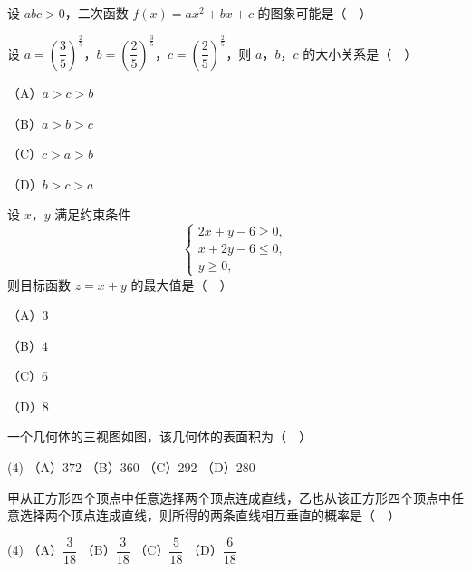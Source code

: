\begingroup
\renewenvironment{question}{\Needspace{0.5\textheight}}{}
\begin{question}
设 $abc>0$，二次函数 $f(x)=ax^2+bx+c$ 的图象可能是（　）
\nopagebreak[4]
\begin{center}\end{center}
\nopagebreak[4]
\end{question}
\endgroup
\begin{question}
设 $a=\left(\dfrac35\right)^{\frac25}$，$b=\left(\dfrac25\right)^{\frac35}$，$c=\left(\dfrac25\right)^{\frac25}$，则 $a$，$b$，$c$ 的大小关系是（　）

（A）$a>c>b$

（B）$a>b>c$

（C）$c>a>b$

（D）$b>c>a$

\end{question}
\begin{question}
设 $x$，$y$ 满足约束条件
\nopagebreak[4]
\[\begin{cases}2x+y-6\geqslant0,\\ x+2y-6\leqslant0,\\ y\geqslant0,\end{cases}\]
则目标函数 $z=x+y$ 的最大值是（　）

（A）$3$

（B）$4$

（C）$6$

（D）$8$

\Needspace{0.4\textheight}
\end{question}
\begingroup
\renewenvironment{question}{\Needspace{0.5\textheight}}{}
\begin{question}
一个几何体的三视图如图，该几何体的表面积为（　）
\nopagebreak[4]
\begin{center}\end{center}
\nopagebreak[4]
\begin{gkopts}(4)
\task （A）$372$
\task （B）$360$
\task （C）$292$
\task （D）$280$
\end{gkopts}

\end{question}
\endgroup
\begin{question}
甲从正方形四个顶点中任意选择两个顶点连成直线，乙也从该正方形四个顶点中任意选择两个顶点连成直线，则所得的两条直线相互垂直的概率是（　）

\begin{gkopts}(4)
\task （A）$\dfrac3{18}$
\task （B）$\dfrac3{18}$
\task （C）$\dfrac5{18}$
\task （D）$\dfrac6{18}$
\end{gkopts}

\end{question}


